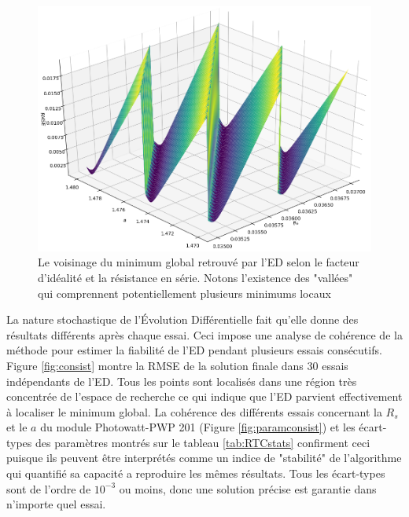 \begin{figure}[H]
  \begin{center}
    \includegraphics[width=\textwidth]{resources/RTCFrance/singled/neighborhood.png}
    \caption{Le voisinage du minimum global retrouvé par l'ED selon le facteur d'idéalité et la résistance en série. Notons l'existence des "vallées" qui comprennent potentiellement plusieurs minimums locaux}
    \label{fig:neigh}
  \end{center}
\end{figure}

La nature stochastique de l'Évolution Différentielle fait qu'elle donne des résultats différents après chaque essai. Ceci impose une analyse de cohérence de la méthode pour estimer la fiabilité de l'ED pendant plusieurs essais consécutifs. Figure \ref{fig:consist} montre la RMSE de la solution finale dans 30 essais indépendants de l'ED.
Tous les points sont localisés dans une région très concentrée de l'espace de recherche ce qui indique que l'ED parvient effectivement à localiser le minimum global.
La cohérence des différents essais concernant la $R_s$ et le $a$ du module Photowatt-PWP 201 (Figure \ref{fig:paramconsist}) et les écart-types des paramètres montrés sur le tableau \ref{tab:RTCstats} confirment ceci puisque ils peuvent être interprétés comme un indice de "stabilité" de l'algorithme qui quantifié sa capacité a reproduire les mêmes résultats. Tous les écart-types sont de l'ordre de $10^{-3}$ ou moins, donc une solution précise est garantie dans n'importe quel essai.

